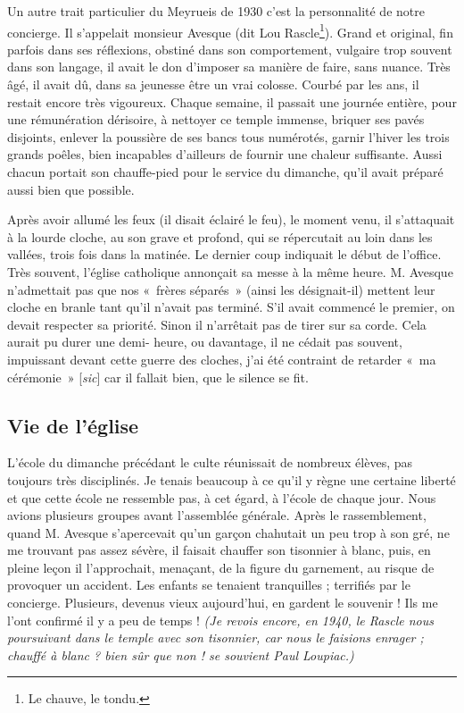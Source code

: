 Un autre trait particulier du Meyrueis de 1930 c’est la personnalité de notre
concierge. Il s’appelait monsieur Avesque (dit Lou Rascle\footnote{Le chauve, le tondu.}). Grand et original, fin parfois dans ses
réflexions, obstiné dans son comportement, vulgaire trop souvent dans son langage, il
avait le don d’imposer sa manière de faire, sans nuance. Très âgé, il avait dû, dans sa
jeunesse être un vrai colosse. Courbé par les ans, il restait encore très vigoureux.
Chaque semaine, il passait une journée entière, pour une rémunération dérisoire, à
nettoyer ce temple immense, briquer ses pavés disjoints, enlever la poussière de ses
bancs tous numérotés, garnir l’hiver les trois grands poêles, bien incapables d’ailleurs
de fournir une chaleur suffisante. Aussi chacun portait son chauffe-pied pour le
service du dimanche, qu’il avait préparé aussi bien que possible.

Après avoir allumé les feux (il disait éclairé le feu), le moment venu, il s’attaquait à
la lourde cloche, au son grave et profond, qui se répercutait au loin dans les vallées,
trois fois dans la matinée. Le dernier coup indiquait le début de l’office. Très souvent,
l’église catholique annonçait sa messe à la même heure. M. Avesque n’admettait pas
que nos «~frères séparés~» (ainsi les désignait-il) mettent leur cloche en branle tant
qu’il n’avait pas terminé. S’il avait commencé le premier, on devait respecter sa
priorité. Sinon il n’arrêtait pas de tirer sur sa corde. Cela aurait pu durer une demi-
heure, ou davantage, il ne cédait pas souvent, impuissant devant cette guerre des
cloches, j’ai été contraint de retarder «~ma cérémonie~» [\textit{sic}] car il fallait bien, que le
silence se fit.

\subsection{Vie de l’église}

L’école du dimanche précédant le culte réunissait de nombreux élèves, pas toujours
très disciplinés. Je tenais beaucoup à ce qu’il y règne une certaine liberté et que cette
école ne ressemble pas, à cet égard, à l’école de chaque jour. Nous avions plusieurs
groupes avant l’assemblée générale. Après le rassemblement, quand M. Avesque
s’apercevait qu’un garçon chahutait un peu trop à son gré, ne me trouvant pas assez
sévère, il faisait chauffer son tisonnier à blanc, puis, en pleine leçon il l’approchait, menaçant, de la figure du garnement, au risque de provoquer un accident. Les enfants
se tenaient tranquilles ; terrifiés par le concierge. Plusieurs, devenus vieux
aujourd’hui, en gardent le souvenir ! Ils me l’ont confirmé il y a peu de temps !
\emph{(Je revois encore, en 1940, le Rascle nous poursuivant dans le temple avec son tisonnier, car nous le
faisions enrager ; chauffé à blanc ? bien sûr que non ! se souvient Paul Loupiac.)}


